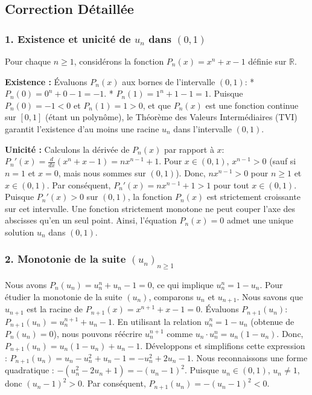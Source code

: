 \documentclass[a4paper,11pt]{report}
\begin{document}
\subsection*{Correction Détaillée}

\subsubsection*{1. Existence et unicité de $u_n$ dans $(0,1)$}

Pour chaque $n \ge 1$, considérons la fonction $P_n(x) = x^n + x - 1$ définie sur $\mathbb{R}$.

\textbf{Existence :}
Évaluons $P_n(x)$ aux bornes de l'intervalle $(0,1)$:
*   $P_n(0) = 0^n + 0 - 1 = -1$.
*   $P_n(1) = 1^n + 1 - 1 = 1$.
Puisque $P_n(0) = -1 < 0$ et $P_n(1) = 1 > 0$, et que $P_n(x)$ est une fonction continue sur $[0,1]$ (étant un polynôme), le Théorème des Valeurs Intermédiaires (TVI) garantit l'existence d'au moins une racine $u_n$ dans l'intervalle $(0,1)$.

\textbf{Unicité :}
Calculons la dérivée de $P_n(x)$ par rapport à $x$:
$P_n'(x) = \frac{d}{dx}(x^n + x - 1) = nx^{n-1} + 1$.
Pour $x \in (0,1)$, $x^{n-1} > 0$ (sauf si $n=1$ et $x=0$, mais nous sommes sur $(0,1)$).
Donc, $nx^{n-1} > 0$ pour $n \ge 1$ et $x \in (0,1)$.
Par conséquent, $P_n'(x) = nx^{n-1} + 1 > 1$ pour tout $x \in (0,1)$.
Puisque $P_n'(x) > 0$ sur $(0,1)$, la fonction $P_n(x)$ est strictement croissante sur cet intervalle.
Une fonction strictement monotone ne peut couper l'axe des abscisses qu'en un seul point.
Ainsi, l'équation $P_n(x) = 0$ admet une unique solution $u_n$ dans $(0,1)$.

\subsubsection*{2. Monotonie de la suite $(u_n)_{n \ge 1}$}

Nous avons $P_n(u_n) = u_n^n + u_n - 1 = 0$, ce qui implique $u_n^n = 1 - u_n$.
Pour étudier la monotonie de la suite $(u_n)$, comparons $u_n$ et $u_{n+1}$.
Nous savons que $u_{n+1}$ est la racine de $P_{n+1}(x) = x^{n+1} + x - 1 = 0$.
Évaluons $P_{n+1}(u_n)$:
$P_{n+1}(u_n) = u_n^{n+1} + u_n - 1$.
En utilisant la relation $u_n^n = 1 - u_n$ (obtenue de $P_n(u_n)=0$), nous pouvons réécrire $u_n^{n+1}$ comme $u_n \cdot u_n^n = u_n(1 - u_n)$.
Donc, $P_{n+1}(u_n) = u_n(1 - u_n) + u_n - 1$.
Développons et simplifions cette expression :
$P_{n+1}(u_n) = u_n - u_n^2 + u_n - 1 = -u_n^2 + 2u_n - 1$.
Nous reconnaissons une forme quadratique : $-(u_n^2 - 2u_n + 1) = -(u_n - 1)^2$.
Puisque $u_n \in (0,1)$, $u_n \neq 1$, donc $(u_n - 1)^2 > 0$.
Par conséquent, $P_{n+1}(u_n) = -(u_n - 1)^2 < 0$.
\end{document}
